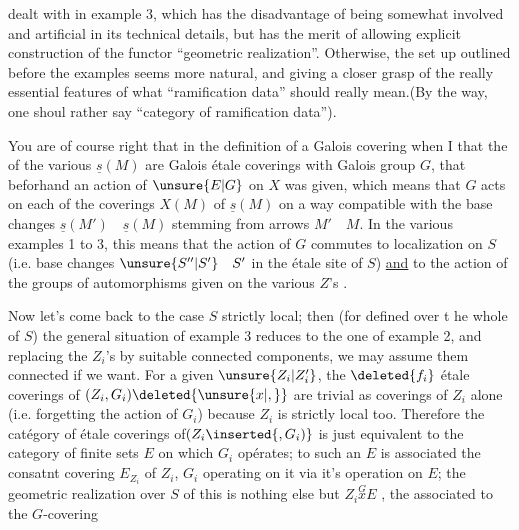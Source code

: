 dealt with in example 3, which has the disadvantage of being somewhat involved and artificial in its technical details, but has the merit of allowing explicit construction of the functor ``geometric realization''. Otherwise, the set up outlined before the examples seems more natural, and giving a closer grasp of the  really essential features of what ``ramification data'' should really mean.(By the way, one shoul rather say ``category of ramification data'').

You are of course right that in the definition of a Galois covering when I  that the  of the various $\underline{s}(M)$ are Galois étale coverings with Galois group $G$, that beforhand an action of $\unsure{E|G}$ on $X$ was given, which means that $G$ acts on each of the coverings $X(M)$ of $\underline{s}(M)$ on a way compatible with the base changes $\underline{s}(M')\quad\underline{s}(M)$ stemming from arrows  $M'\quad M$. In the various examples 1 to 3, this means that the action of $G$ commutes to  localization on $S$ (i.e. base changes $\unsure{S''|S'}\quad S'$ in the étale site of $S$) \uline{and} to the action of the groups of automorphisms given on the various $Z$'s .

Now let's come back to the case $S$ strictly local; then (for  defined over t he whole of $S$) the general situation of example 3 reduces to the one of example 2, and replacing the $Z_i$'s by suitable connected components, we may assume them connected if we want. For a given $\unsure{Z_i|Z_i'}$, the $\deleted{f_i}$ étale coverings of $(Z_i,G_i)\deleted{\unsure{x|,}}$ are trivial as coverings of $Z_i$ alone (i.e. forgetting the action of $G_i$) because $Z_i$ is strictly local too. Therefore the catégory of étale coverings of$(Z_i\inserted{,G_i)}$ is just equivalent to the category of finite sets $E$ on which $G_i$ opérates; to such an $E$ is associated the consatnt covering $E_{Z_i}$ of $Z_i$,  $G_i$ operating on it via it's operation on $E$; the geometric realization over $S$ of this is nothing else but $Z_i\overset{G}{x}E$ , the  associated to the $G$-covering

